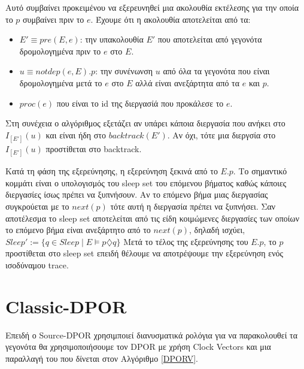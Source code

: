 Αυτό συμβαίνει προκειμένου να εξερευνηθεί μια ακολουθία εκτέλεσης για την οποία το $p$ συμβαίνει πριν το $e$.
Έχουμε ότι η ακολουθία αποτελείται από τα:
\begin{itemize} 
\item $E' \equiv pre(E,e)$: την υπακολουθία $E'$ που αποτελείται από γεγονότα δρομολογημένα πριν το $e$ στο $E$.
\item $u \equiv notdep(e,E).p$: την συνένωνση $u$ από όλα τα γεγονότα που είναι δρομολογημένα μετά το  $e$ στο $E$ αλλά είναι ανεξάρτητα από τα $e$ και $p$.
\item $proc(e)$ που είναι το id της διεργασίά που  προκάλεσε το $e$.
\end{itemize}
Στη συνέχεια ο αλγόριθμος εξετάζει αν υπάρει κάποια διεργασία που ανήκει στο $I_{[E']}(u)$ και είναι ήδη στο $backtrack(E')$. 
Αν όχι, τότε μια διεργσία στο $I_{[E']}(u)$ προστίθεται στο backtrack.

Κατά τη φάση της εξερεύνησης, η εξερεύνηση ξεκινά από το $E.p$. Το σημαντικό κομμάτι είναι ο υπολογισμός του sleep set του επόμενου βήματος καθώς κάποιες διεργασίες ίσως πρέπει να 
ξυπνήσουν.
Αν το επόμενο βήμα μιας διεργασίας συγκρούεται με το $next(p)$ τότε αυτή η διεργασία πρέπει να ξυπνήσει. Σαν αποτέλεσμα το sleep set αποτελείται από τις είδη κοιμώμενες διεργασίες
των οποίων το επόμενο βήμα είναι ανεξάρτητο από το $next(p)$, δηλαδή ισχύει, $Sleep' := \{q \in Sleep \mid E \models p \diamondsuit q \} $ 
Μετά το τέλος της εξερεύνησης του $E.p$, το $p$ προστίθεται στο sleep set επειδή θέλουμε να αποτρέψουμε την εξερεύνηση ενός ισοδύναμου trace.

\section{Classic-DPOR}

Επειδή ο Source-DPOR χρησιμποιεί διανυσματικά ρολόγια για να παρακολουθεί τα γεγονότα θα χρησιμοποιήσουμε τον DPOR με χρήση Clock Vectors \cite{FlanaganDPOR} και μια παραλλαγή του που δίνεται στον Αλγόριθμο \ref{DPORV}.

